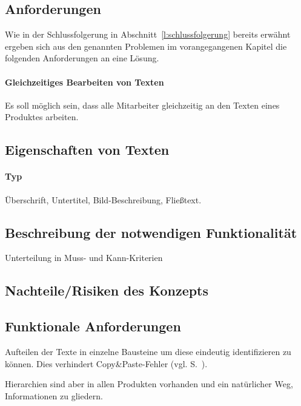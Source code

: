 \subsection{Anforderungen}\label{l:anforderungen}

Wie in der Schlussfolgerung in Abschnitt~\ref{l:schlussfolgerung} bereits erwähnt ergeben sich aus den genannten Problemen im vorangegangenen Kapitel die folgenden Anforderungen an eine Lösung.

\paragraph{Gleichzeitiges Bearbeiten von Texten} Es soll möglich sein, dass alle  Mitarbeiter gleichzeitig an den Texten eines Produktes arbeiten.



\subsection{Eigenschaften von Texten}
\label{l:textattribute}

\paragraph{Typ} Überschrift, Untertitel, Bild-Beschreibung, Fließtext.

\subsection{Beschreibung der notwendigen Funktionalität}

Unterteilung in Muss- und Kann-Kriterien

\subsection{Nachteile/Risiken des Konzepts}

\subsection{Funktionale Anforderungen}

\label{l:anforderungen}

\TODO

Aufteilen der Texte in einzelne Bausteine um diese eindeutig identifizieren zu können. Dies verhindert Copy\&Paste-Fehler (vgl. S.~\pageref{p:serielles-konzept}).

\label{l:hierarchien} Hierarchien sind aber in allen Produkten vorhanden und ein natürlicher Weg, Informationen zu gliedern. 
